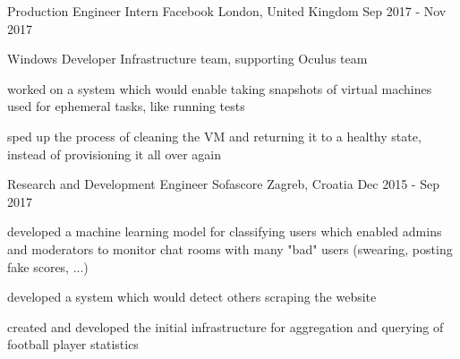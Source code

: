 \begin{cventries}
  \cventry
    {Production Engineer Intern} %
    {Facebook} %
    {London, United Kingdom} %
    {Sep 2017 - Nov 2017} %
    {
      \begin{cvitems} %
        \item {Windows Developer Infrastructure team, supporting Oculus team}
        \item {worked on a system which would enable taking snapshots of virtual machines used for ephemeral tasks, like running tests}
        \item {sped up the process of cleaning the VM and returning it to a healthy state, instead of provisioning it all over again}
      \end{cvitems}
    }

  \cventry
    {Research and Development Engineer} %
    {Sofascore} %
    {Zagreb, Croatia} %
    {Dec 2015 - Sep 2017} %
    {
      \begin{cvitems} %
        \item {developed a machine learning model for classifying users which enabled admins and moderators to monitor chat rooms with many "bad" users (swearing, posting fake scores, ...)}
        \item {developed a system which would detect others scraping the website}
        \item {created and developed the initial infrastructure for aggregation and querying of football player statistics}
      \end{cvitems}
    }


\end{cventries}
